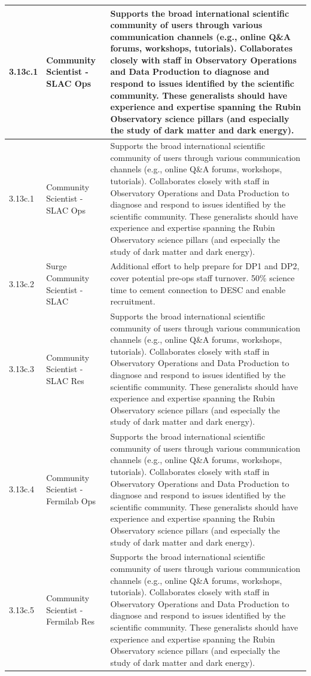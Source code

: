 \begin{longtable} {|p{}|p{}|p{}|}
{3.13c.1}&{Community Scientist - SLAC Ops}&{Supports the broad international scientific community of users through various communication channels (e.g., online Q\&A forums, workshops, tutorials). Collaborates closely with staff in Observatory Operations and Data Production to diagnose and respond to issues identified by the scientific community.  These generalists should have experience and expertise spanning the Rubin Observatory science pillars (and especially the study of dark matter and dark energy).} \\ \hline
{3.13c.1}&{Community Scientist - SLAC Ops}&{Supports the broad international scientific community of users through various communication channels (e.g., online Q\&A forums, workshops, tutorials). Collaborates closely with staff in Observatory Operations and Data Production to diagnose and respond to issues identified by the scientific community.  These generalists should have experience and expertise spanning the Rubin Observatory science pillars (and especially the study of dark matter and dark energy).} \\ \hline
{3.13c.2}&{Surge Community Scientist - SLAC}&{Additional effort to help prepare for DP1 and DP2, cover potential pre-ops staff turnover. 50\% science time to cement connection to DESC and enable recruitment.} \\ \hline
{3.13c.3}&{Community Scientist - SLAC Res}&{Supports the broad international scientific community of users through various communication channels (e.g., online Q\&A forums, workshops, tutorials). Collaborates closely with staff in Observatory Operations and Data Production to diagnose and respond to issues identified by the scientific community.  These generalists should have experience and expertise spanning the Rubin Observatory science pillars (and especially the study of dark matter and dark energy).} \\ \hline
{3.13c.4}&{Community Scientist - Fermilab Ops}&{Supports the broad international scientific community of users through various communication channels (e.g., online Q\&A forums, workshops, tutorials). Collaborates closely with staff in Observatory Operations and Data Production to diagnose and respond to issues identified by the scientific community.  These generalists should have experience and expertise spanning the Rubin Observatory science pillars (and especially the study of dark matter and dark energy).} \\ \hline
{3.13c.5}&{Community Scientist - Fermilab Res}&{Supports the broad international scientific community of users through various communication channels (e.g., online Q\&A forums, workshops, tutorials). Collaborates closely with staff in Observatory Operations and Data Production to diagnose and respond to issues identified by the scientific community.  These generalists should have experience and expertise spanning the Rubin Observatory science pillars (and especially the study of dark matter and dark energy).} \\ \hline

\end{longtable}
